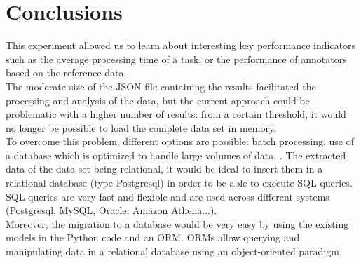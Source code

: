 \documentclass[letterpaper,12pt]{article}
\begin{document}
\section{Conclusions}
This experiment allowed us to learn about interesting key performance indicators such as the average processing time of a task, or the performance of annotators based on the reference data.\\
The moderate size of the JSON file containing the results facilitated the processing and analysis of the data, but the current approach could be problematic with a higher number of results: from a certain threshold, it would no longer be possible to load the complete data set in memory.\\
To overcome this problem, different options are possible: batch processing, use of a database which is optimized to handle large volumes of data, .
The extracted data of the data set being relational, it would be ideal to insert them in a relational database (type Postgresql) in order to be able to execute SQL queries. SQL queries are very fast and flexible and are used across different systems (Postgresql, MySQL, Oracle, Amazon Athena...).\\
Moreover, the migration to a database would be very easy by using the existing models in the Python code and an ORM. ORMs allow querying and manipulating data in a relational database using an object-oriented paradigm.
\end{document}
